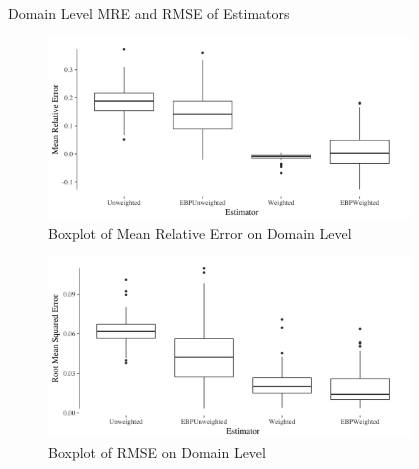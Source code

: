 \documentclass[fleqn,final]{beamer}
\newcommand{\Pheight}{\rule[-5mm]{0cm}{1cm}}
\begin{document}
\begin{frame}
\begin{columns}[t]
\begin{column}{.3\linewidth}
\begin{block}{Domain Level MRE and RMSE of Estimators \Pheight}
\begin{center}
	\begin{figure}
		\includegraphics[width=0.9\textwidth]{BoxPlotMREByDomain}
		\caption{Boxplot of Mean Relative Error on Domain Level}
	\end{figure}
		\begin{figure}
		\includegraphics[width=0.9\textwidth]{BoxPlotRMSEByDomain}
		\caption{Boxplot of RMSE on Domain Level}
	\end{figure}
\end{center}
\end{block}

\end{column}

%

\begin{column}{.3\linewidth}



\end{column}
\end{columns}
\end{frame}
\end{document}
